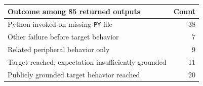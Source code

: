 \begin{tabular}{lr}
\toprule
Outcome among 85 returned outputs & Count \\
\midrule
Python invoked on missing \texttt{PY} file & 38 \\
Other failure before target behavior & 7 \\
Related peripheral behavior only & 9 \\
Target reached; expectation insufficiently grounded & 11 \\
Publicly grounded target behavior reached & 20 \\
\bottomrule
\end{tabular}
